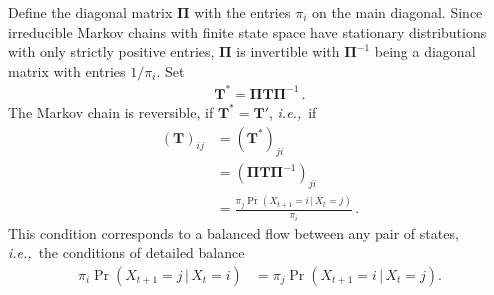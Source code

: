 \documentclass[preprint]{elsarticle}
\newcommand\given{{\,|\,}}
\newcommand\ie{{\it i.e.,}}
\newcommand\x[1]{\ensuremath{X_{#1}}}
\begin{document}
Define the diagonal matrix $\mathbf{\Pi}$ with the entries $\pi_i$ on the main diagonal. Since irreducible Markov chains with finite state space have stationary distributions with only strictly positive entries, $\mathbf{\Pi}$ is invertible with $\mathbf{\Pi}^{-1}$ being a diagonal matrix with entries $1/\pi_i$.  Set
\begin{equation}\label{eq:reverse_transition}
\begin{split}
\mathbf{T}^{*}=\mathbf{\Pi}\mathbf{T}\mathbf{\Pi}^{-1}\,.
\end{split}
\end{equation}
The Markov chain is reversible, if $\mathbf{T}^{*}=\mathbf{T}'$, \ie\ if
\begin{align}\label{eq:detailed_balance}
(\mathbf{T})_{ij}             &= (\mathbf{T}^{*})_{ji} \\
                              &= (\mathbf{\Pi}\mathbf{T}\mathbf{\Pi}^{-1})_{ji} \\
                              &= \frac{\pi_j \Pr(\x{t+1}=i \given \x{t}=j)}{\pi_i}\,.
\end{align}
This condition corresponds to a balanced flow between any pair of states, \ie\ the conditions of detailed balance
\begin{align}
\pi_i \Pr(\x{t+1}=j \given \x{t}=i)
                              &=  \pi_j \Pr(\x{t+1}=i \given \x{t}=j).
\end{align}
\end{document}
